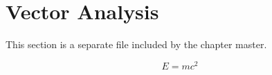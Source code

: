 \section{Vector Analysis}

This section is a separate file included by the chapter master.

\begin{equation}
E = mc^2
\end{equation}
